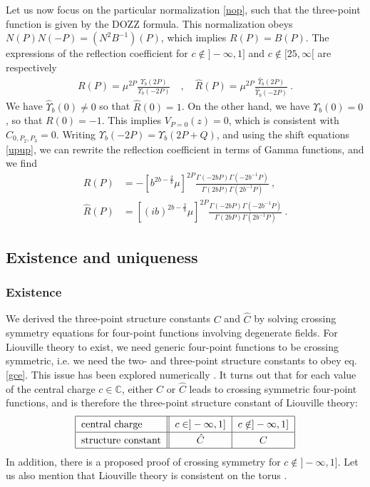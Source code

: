 \documentclass[12pt, a4paper, notitlepage, twoside]{report}
\numberwithin{equation}{section}
\theoremstyle{break}
\begin{document}
Let us now focus on the particular normalization \eqref{nop}, such that the three-point function is given by the DOZZ formula. This normalization obeys $N(P)N(-P) = \left(N^2B^{-1}\right)(P)$, which implies $R(P)=B(P)$. 
The expressions of the reflection coefficient for $c\notin ]-\infty, 1]$ and $c\notin [25,\infty[$ are respectively
\begin{align}
 R(P) = \mu^{2P}\frac{\Upsilon_b(2P)}{\Upsilon_b(-2P)} \quad , \quad \hat R(P) = \mu^{2P}\frac{\hat{\Upsilon}_b(2P)}{\hat{\Upsilon}_b(-2P)}\ .
 \end{align}
We have  $\hat\Upsilon_b(0)\neq 0$ so that $\hat R(0)=1$. On the other hand, we have $\Upsilon_b(0)=0$, so that $R(0)=-1$. This implies $V_{P=0}(z)=0$, which is consistent with $C_{0,P_2,P_3}=0$.
Writing $\Upsilon_b(-2P)=\Upsilon_b(2P+Q)$, and using the shift equations \eqref{upup}, we can rewrite the reflection coefficient in terms of Gamma functions, and we find 
\begin{align}
 R(P) &= -\left[b^{2b-\frac{2}{b}}\mu\right]^{2P} \frac{\Gamma(-2bP)\Gamma(-2b^{-1}P)}{\Gamma(2bP)\Gamma(2b^{-1}P)} \ ,
 \label{ram}
\\
 \hat R(P) &= \left[(ib)^{2b-\frac{2}{b}}\mu\right]^{2P} \frac{\Gamma(-2bP)\Gamma(-2b^{-1}P)}{\Gamma(2bP)\Gamma(2b^{-1}P)} \ .
\end{align}


\subsection{Existence and uniqueness}\label{seceul}

\subsubsection{Existence}

We derived the three-point structure constants $C$ and $\hat C$ by solving crossing symmetry equations for four-point functions involving degenerate fields. 
For Liouville theory to exist, we need generic four-point functions to be crossing symmetric, i.e. we need the two- and three-point structure constants to obey eq. \eqref{gce}.
This issue has been explored numerically \cite{rs15}. 
It turns out that for each value of the central charge $c\in\mathbb{C}$, either $C$ or $\hat C$ leads to crossing symmetric four-point functions, and is therefore the three-point structure constant of Liouville theory:
\begin{align}
\renewcommand{\arraystretch}{1.3}
 \begin{tabular}{|l||c|c|}
  \hline
  central charge &  $c\in ]-\infty, 1]$ & $c\notin ]-\infty, 1]$
  \\
  \hline
  structure constant & $\hat C$  & $C$ 
  \\
  \hline
 \end{tabular}
 \label{ccr}
\end{align}
In addition, there is a proposed proof \cite{tes03b} of crossing symmetry for $c\notin ]-\infty, 1]$.
Let us also mention that Liouville theory is consistent on the torus \cite{hjs09, rs15}. 
\end{document}
